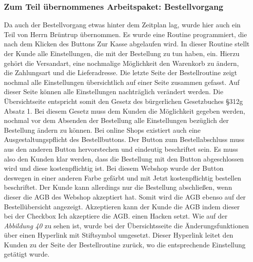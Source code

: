 \subsubsection{Zum Teil übernommenes Arbeitspaket: Bestellvorgang}
Da auch der Bestellvorgang etwas hinter dem Zeitplan lag, wurde hier auch ein Teil von Herrn Brüntrup übernommen. Es wurde eine Routine programmiert, die nach dem Klicken des Buttons \glqq Zur Kasse\grqq{} abgelaufen wird. In dieser Routine stellt der Kunde alle Einstellungen, die mit der Bestellung zu tun haben, ein. Hierzu gehört die Versandart, eine nochmalige Möglichkeit den Warenkorb zu ändern, die Zahlungsart und die Lieferadresse. Die letzte Seite der Bestellroutine zeigt nochmal alle Einstellungen übersichtlich auf einer Seite zusammen gefasst. Auf dieser Seite können alle Einstellungen nachträglich verändert werden. Die Übersichtseite entspricht somit den Gesetz des bürgerlichen Gesetzbuches §312g Absatz 1. Bei diesem Gesetz muss dem Kunden die Möglichkeit gegeben werden, nochmal vor dem Absenden der Bestellung alle Einstellungen bezüglich der Bestellung ändern zu können. Bei online Shops existiert auch eine \glqq Ausgestaltungspflicht des Bestellbuttons\grqq{}. Der Button zum Bestellabschluss muss aus den anderen Button hervorstechen und eindeutig beschriftet sein. Es muss also den Kunden klar werden, dass die Bestellung mit den Button abgeschlossen wird und diese kostenpflichtig ist. Bei diesem Webshop wurde der Button deswegen in einer anderen Farbe gefärbt und mit \glqq Jetzt kostenpflichtig bestellen\grqq{} beschriftet. Der Kunde kann allerdings nur die Bestellung abschließen, wenn dieser die AGB des Webshop akzeptiert hat. Somit wird die AGB ebenso auf der Bestellübersicht angezeigt. Akzeptieren kann der Kunde die AGB indem dieser bei der Checkbox \glqq Ich akzeptiere die AGB.\grqq{} einen Hacken setzt. Wie auf der \textit{Abbildung 40} zu sehen ist, wurde bei der Übersichtsseite die Änderungsfunktionen über einen Hyperlink mit Stiftsymbol umgesetzt. Dieser Hyperlink leitet den Kunden zu der Seite der Bestellroutine zurück, wo die entsprechende Einstellung getätigt wurde.

